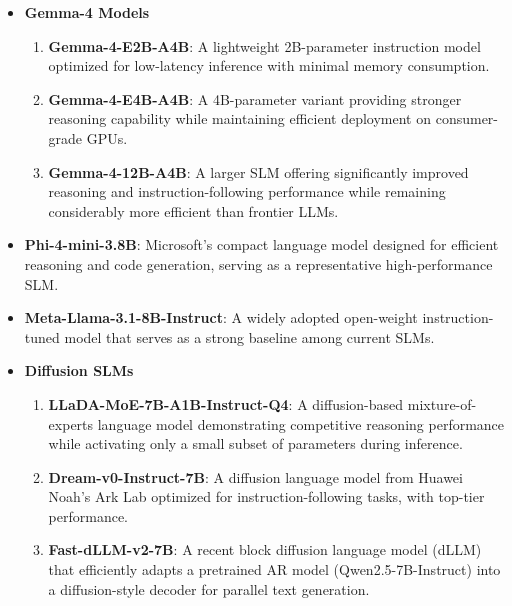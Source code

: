 \documentclass[lettersize,journal]{IEEEtran}
\begin{document}
\begin{itemize}
    \item \textbf{Gemma-4 Models}
    \begin{enumerate}
        \item \textbf{Gemma-4-E2B-A4B}: A lightweight 2B-parameter instruction model optimized for low-latency inference with minimal memory consumption.

        \item \textbf{Gemma-4-E4B-A4B}: A 4B-parameter variant providing stronger reasoning capability while maintaining efficient deployment on consumer-grade GPUs.

        \item \textbf{Gemma-4-12B-A4B}: A larger SLM offering significantly improved reasoning and instruction-following performance while remaining considerably more efficient than frontier LLMs.
    \end{enumerate}

    \item \textbf{Phi-4-mini-3.8B}: Microsoft's compact language model designed for efficient reasoning and code generation, serving as a representative high-performance SLM.

    \item \textbf{Meta-Llama-3.1-8B-Instruct}: A widely adopted open-weight instruction-tuned model that serves as a strong baseline among current SLMs.

    \item \textbf{Diffusion SLMs}
    \begin{enumerate}
        \item \textbf{LLaDA-MoE-7B-A1B-Instruct-Q4}: A diffusion-based mixture-of-experts language model demonstrating competitive reasoning performance while activating only a small subset of parameters during inference.

        \item \textbf{Dream-v0-Instruct-7B}: A diffusion language model from Huawei Noah's Ark Lab optimized for instruction-following tasks, with top-tier performance.

        \item \textbf{Fast-dLLM-v2-7B}: A recent block diffusion language model (dLLM) that efficiently adapts a pretrained AR model (Qwen2.5-7B-Instruct) into a diffusion-style decoder for parallel text generation.
    \end{enumerate}
\end{itemize}
\end{document}
